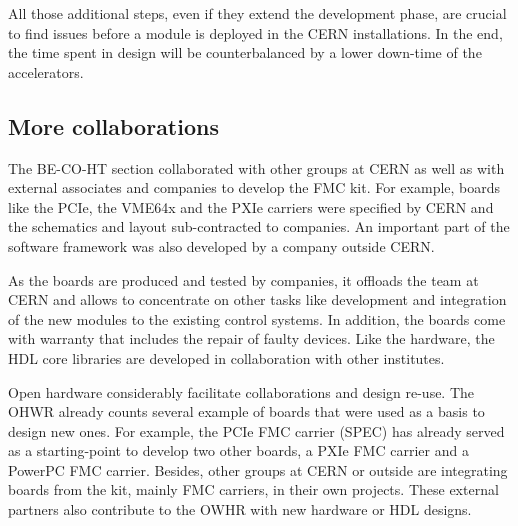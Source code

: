 \documentclass{JAC2003}
\begin{document}
All those additional steps, even if they extend the development phase, are crucial to find issues before a module is deployed in the CERN installations.
In the end, the time spent in design will be counterbalanced by a lower down-time of the accelerators.



\subsection{More collaborations}
The BE-CO-HT section collaborated with other groups at CERN as well as with external associates and companies to develop the FMC kit.
For example, boards like the PCIe, the VME64x and the PXIe carriers were specified by CERN and the schematics and layout sub-contracted to companies.
An important part of the software framework was also developed by a company outside CERN.

As the boards are produced and tested by companies, it offloads the team at CERN and allows to concentrate on other tasks like development and integration of the new modules to the existing control systems.
In addition, the boards come with warranty that includes the repair of faulty devices.
Like the hardware, the HDL core libraries are developed in collaboration with other institutes.

Open hardware considerably facilitate collaborations and design re-use.
The OHWR already counts several example of boards that were used as a basis to design new ones.
For example, the PCIe FMC carrier (SPEC) has already served as a starting-point to develop two other boards, a PXIe FMC carrier and a PowerPC FMC carrier.
Besides, other groups at CERN or outside are integrating boards from the kit, mainly FMC carriers, in their own projects.
These external partners also contribute to the OWHR with new hardware or HDL designs.

\end{document}
